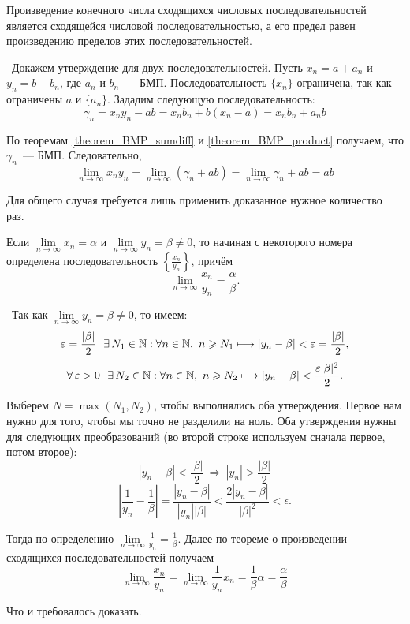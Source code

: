 \begin{theorem}
Произведение конечного числа сходящихся числовых последовательностей
является сходящейся числовой последовательностью, а его предел
равен произведению пределов этих последовательностей.

\vspace{2mm}

\proofname~Докажем утверждение для двух последовательностей.
Пусть \(x_{n} = a + a_{n}\) и \(y_{n} = b + b_{n}\), где \(a_{n}\) и \(b_{n}\)~--- БМП.
Последовательность \(\{x_{n}\}\) ограничена, так как ограничены \(a\) и \(\{a_{n}\}\).
Зададим следующую последовательность:
\[
\gamma_{n} = x_{n}y_{n} - ab = x_{n}b_{n} + b(x_{n} - a) = x_{n}b_{n} + a_{n}b
\]

По теоремам \ref{theorem_BMP_sumdiff} и \ref{theorem_BMP_product} получаем, что \(\gamma_{n}\)~--- БМП. Следовательно,
\[
\lim_{ n \to \infty } x_{n}y_{n} =
\lim_{ n \to \infty } (\gamma_{n} + ab) =
\lim_{ n \to \infty } \gamma_{n} + ab = ab
\]

Для общего случая требуется лишь применить доказанное нужное количество раз.~\qedsymbol
\end{theorem}

\begin{theorem}
Если \(\lim\limits_{n \to \infty} x_{n} = \alpha\) и
\(\lim\limits_{n \to \infty} y_{n}= \beta \neq 0\), то начиная
с некоторого номера определена последовательность \(\left\{\frac{x_{n}}{y_{n}}\right\}\), причём
\[
\lim\limits_{n \to \infty} \frac{x_{n}}{y_{n}} = \frac{\alpha}{\beta}.
\]

\vspace{2mm}

\proofname~Так как
\(\lim\limits_{n \to \infty} y_{n}= \beta \neq 0\), то имеем:
\[
\varepsilon = \frac{|\beta|}{2} ~~ \exists \, N_{1} \in \mathbb{N}:
\forall n \in \mathbb{N}, ~ n \geqslant N_{1} \longmapsto |y_{n} - \beta| < \varepsilon = \frac{|\beta|}{2},
\]
\[
\forall \, \varepsilon > 0 ~~ \exists \, N_{2} \in \mathbb{N}:
\forall n \in \mathbb{N}, ~ n \geqslant N_{2} \longmapsto |y_{n} - \beta| < \frac{\varepsilon|\beta|^2}{2}.
\]

Выберем \(N = \max(N_{1}, N_{2})\), чтобы выполнялись оба утверждения.
Первое нам нужно для того, чтобы мы точно не разделили на ноль.
Оба утверждения нужны для следующих преобразований
(во второй строке используем сначала первое, потом второе):
\[
|y_{n} - \beta| < \frac{|\beta|}{2} ~ \Rightarrow ~ |y_{n}| > \frac{|\beta|}{2}
\]
\[
\left|\frac{1}{y_{n}} - \frac{1}{\beta}\right|
= \frac{|y_{n} - \beta|}{|y_{n}||\beta|}
< \frac{2|y_{n} - \beta|}{|\beta|^{2}} < \epsilon.
\]

Тогда по определению \(\lim\limits_{n \to \infty} \frac{1}{y_{n}} = \frac{1}{\beta}\).
Далее по теореме о произведении сходящихся последовательностей получаем
\[
\lim\limits_{n \to \infty} \frac{x_{n}}{y_{n}} =
\lim_{n \to \infty} \frac{1}{y_{n}}x_{n} = \frac{1}{\beta}\alpha = \frac{\alpha}{\beta}
\]

Что и требовалось доказать.~\qedsymbol
\end{theorem}

